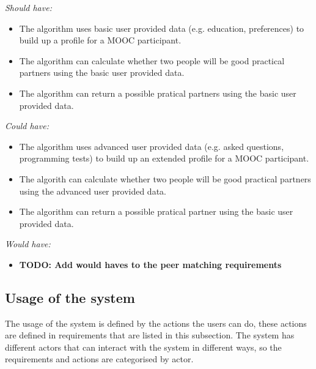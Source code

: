 \documentclass[]{article}
\newcommand{\TODO}[1]{{\color{red}\textbf{TODO: #1}}}
\begin{document}
\emph{Should have:}
\begin{itemize}
\item The algorithm uses basic user provided data (e.g. education, preferences) to build up a profile for a MOOC participant.
\item The algorithm can calculate whether two people will be good practical partners using the basic user provided data.
\item The algorithm can return a possible pratical partners using the basic user provided data.
\end{itemize}

\emph{Could have:}
\begin{itemize}
\item The algorithm uses advanced user provided data (e.g. asked questions, programming tests) to build up an extended profile for a MOOC participant.
\item The algorith can calculate whether two people will be good practical partners using the advanced user provided data.
\item The algorithm can return a possible pratical partner using the basic user provided data.
\end{itemize}

\emph{Would have:}
\begin{itemize}
\item \TODO{Add would haves to the peer matching requirements}
\end{itemize}

\subsection{Usage of the system}
The usage of the system is defined by the actions the users can do, these actions are defined in requirements that are listed in this subsection.
The system has different actors that can interact with the system in different ways, so the requirements and actions are categorised by actor.
\end{document}
